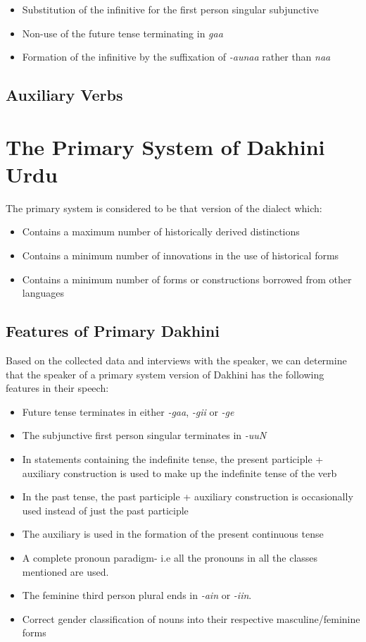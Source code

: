 \documentclass[a4paper]{article}
\begin{document}
\begin{itemize}
\item
Substitution of the infinitive for the first person singular subjunctive
\item
Non-use of the future tense terminating in \textit{gaa}
\item
Formation of the infinitive by the suffixation of \textit{-aunaa} rather than \textit{naa}
\end{itemize}

\subsection{Auxiliary Verbs}

\section{The Primary System of Dakhini Urdu}

The primary system is considered to be that version of the dialect which:

\begin{itemize}
\item
Contains a maximum number of historically derived distinctions
\item
Contains a minimum number of innovations in the use of historical forms
\item
Contains a minimum number of forms or constructions borrowed from other languages
\end{itemize}

\subsection{Features of Primary Dakhini}

Based on the collected data and interviews with the speaker, we can determine that the speaker of a primary system version of Dakhini has the following features in their speech:

\begin{itemize}
\item
Future tense terminates in either \textit{-gaa}, \textit{-gii} or \textit{-ge}
\item
The subjunctive first person singular terminates in \textit{-uuN}
\item
In statements containing the indefinite tense, the present participle + auxiliary construction is used to make up the indefinite tense of the verb
\item
In the past tense, the past participle + auxiliary construction is occasionally used instead of just the past participle
\item
The auxiliary is used in the formation of the present continuous tense
\item
A complete pronoun paradigm- i.e all the pronouns in all the classes mentioned are used.
\item
The feminine third person plural ends in \textit{-ain} or \textit{-iin}.
\item
Correct gender classification of nouns into their respective masculine/feminine forms
\end{itemize}
\end{document}
